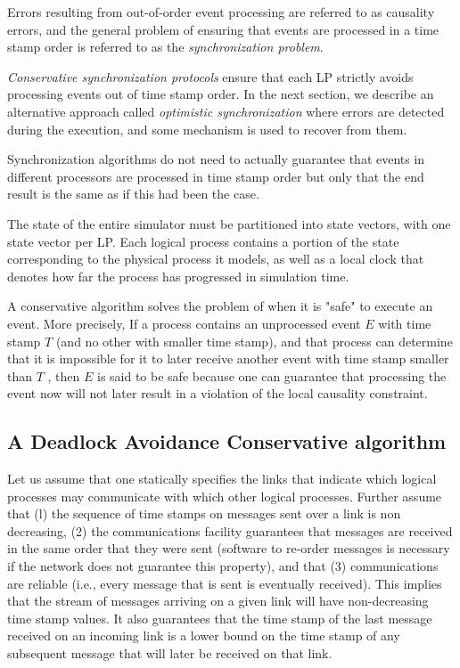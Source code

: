 \documentclass[12pt,a4paper]{article}
\begin{document}
	Errors resulting from out-of-order event processing are referred to as causality errors, and the general problem of ensuring that events are processed in a time stamp order is referred to as the \emph{synchronization problem}.
	
	\emph{Conservative synchronization protocols} ensure that each LP strictly avoids processing events out of time stamp order. In the next section, we describe an alternative approach called \emph{optimistic synchronization} where errors are detected during the execution, and some mechanism is used to recover from them.
	
	Synchronization algorithms do not need to actually guarantee that events in different processors are processed in time stamp order but only that the end result is the same as if this had been the case.
	
	The state of the entire simulator must be partitioned into state vectors, with one state vector per LP. Each logical process contains a portion of the state corresponding to the physical process it models, as well as a local clock that denotes how far the process has progressed in simulation time.
	
	
	A conservative algorithm solves the problem of when it is "safe" to execute an event. More precisely, If a process contains an unprocessed event $E$ with time stamp $T$ (and no other with smaller time stamp), and that process can determine that it is impossible for it to later receive another event with time stamp smaller than $T$ , then $E$ is said to be safe because one can guarantee that processing the event now will not later result in a violation of the local causality constraint. 
	
	\subsection{A Deadlock Avoidance Conservative algorithm}
	
	Let us assume that one statically specifies the links that indicate which logical processes may communicate with which other logical processes. Further assume that (l) the sequence of time stamps on messages sent over a link is non decreasing, (2) the communications facility guarantees that messages are received in the same order that they were sent (software to re-order messages is necessary if the network does not guarantee this property), and that (3) communications are reliable (i.e., every message that is sent is eventually received). This implies that the stream of messages arriving on a given link will have non-decreasing time stamp values. It also guarantees that the time stamp of the last message received on an incoming link
is a lower bound on the time stamp of any subsequent message that will later be received on that link.
\end{document}

